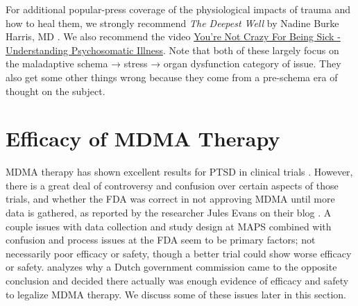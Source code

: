 \documentclass[12pt,letterpaper]{book}
\begin{document}
For additional popular-press coverage of the physiological impacts of trauma and how to heal them, we strongly recommend \textit{The Deepest Well} by Nadine Burke Harris, MD \cite{harris2018deepest}. We also recommend the video \href{https://www.youtube.com/watch?v=oHoFqwF2OAU}{You're Not Crazy For Being Sick - Understanding Psychosomatic Illness}. Note that both of these largely focus on the maladaptive schema → stress → organ dysfunction category of issue. They also get some other things wrong because they come from a pre-schema era of thought on the subject.
\section{Efficacy of MDMA Therapy}
MDMA therapy has shown excellent results for PTSD in clinical trials \cite{mitchellMDMAClinicalTrial,mitchellMDMAClinicalTrial2}. However, there is a great deal of controversy and confusion over certain aspects of those trials, and whether the FDA was correct in not approving MDMA until more data is gathered, as reported by the researcher Jules Evans on their blog \textcite{evansBlame}. A couple issues with data collection and study design at MAPS combined with confusion and process issues at the FDA seem to be primary factors; not necessarily poor efficacy or safety, though a better trial could show worse efficacy or safety. \textcite{fdaVSdutch} analyzes why a Dutch government commission came to the opposite conclusion and decided there actually was enough evidence of efficacy and safety to legalize MDMA therapy. We discuss some of these issues later in this section.
\end{document}
